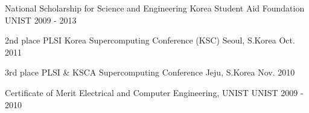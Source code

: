 


\begin{cvhonors}



\cvhonor
{National Scholarship for Science and Engineering} %
{Korea Student Aid Foundation} %
{UNIST} %
{2009 - 2013} %


\cvhonor
{2nd place} %
{PLSI Korea Supercomputing Conference (KSC)} %
{Seoul, S.Korea} %
{Oct. 2011} %


\cvhonor
{3rd place} %
{PLSI \& KSCA Supercomputing Conference} %
{Jeju, S.Korea} %
{Nov. 2010} %


\cvhonor
{Certificate of Merit} %
{Electrical and Computer Engineering, UNIST} %
{UNIST} %
{2009 - 2010} %


\end{cvhonors}
